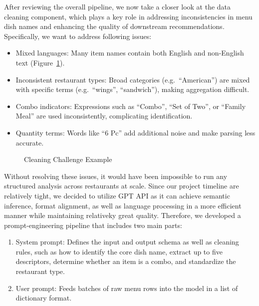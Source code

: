 \documentclass[
  11pt,
  a4paper,
  DIV=11,
  numbers=noendperiod]{scrartcl}
\providecommand{\tightlist}{%
  \setlength{\itemsep}{0pt}\setlength{\parskip}{0pt}}\usepackage{longtable,booktabs,array}
\begin{document}
After reviewing the overall pipeline, we now take a closer look at the
data cleaning component, which plays a key role in addressing
inconsistencies in menu dish names and enhancing the quality of
downstream recommendations. Specifically, we want to address following
issues:

\begin{itemize}
\tightlist
\item
  Mixed languages: Many item names contain both English and non-English
  text (Figure~\ref{fig-cleaning-challenge}).
\item
  Inconsistent restaurant types: Broad categories (e.g.~``American'')
  are mixed with specific terms (e.g.~``wings'', ``sandwich''), making
  aggregation difficult.
\item
  Combo indicators: Expressions such as ``Combo'', ``Set of Two'', or
  ``Family Meal'' are used inconsistently, complicating identification.
\item
  Quantity terms: Words like ``6 Pc'' add additional noise and make
  parsing less accurate.
\end{itemize}

\begin{figure}

\caption{\label{fig-cleaning-challenge}Cleaning Challenge Example}


\end{figure}%

Without resolving these issues, it would have been impossible to run any
structured analysis across restaurants at scale. Since our project
timeline are relatively tight, we decided to utilize GPT API as it can
achieve semantic inference, format alignment, as well as language
processing in a more efficient manner while maintaining relativeky great
quality. Therefore, we developed a prompt-engineering pipeline that
includes two main parts:

\begin{enumerate}
\def\labelenumi{\arabic{enumi}.}
\tightlist
\item
  System prompt: Defines the input and output schema as well as cleaning
  rules, such as how to identify the core dish name, extract up to five
  descriptors, determine whether an item is a combo, and standardize the
  restaurant type.
\item
  User prompt: Feeds batches of raw menu rows into the model in a list
  of dictionary format.
\end{enumerate}
\end{document}
